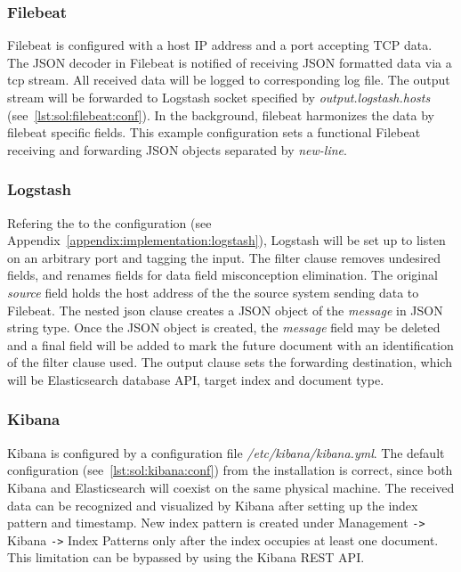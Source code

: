\documentclass[12pt,a4paper,twoside]{report}
\begin{document}
			\subsubsection*{Filebeat}
				Filebeat is configured with a host IP address and a port accepting TCP data. The JSON decoder in Filebeat is notified of receiving JSON formatted data via a tcp stream. All received data will be logged to corresponding log file. The output stream will be forwarded to Logstash socket specified by \emph{output.logstash.hosts} (see~\autoref{lst:sol:filebeat:conf}). In the background, filebeat harmonizes the data by filebeat specific fields. This example configuration sets a functional Filebeat receiving and forwarding JSON objects separated by \emph{new-line}.
				
			\subsubsection*{Logstash}
				Refering the to the configuration (see Appendix~\autoref{appendix:implementation:logstash}), Logstash will be set up to listen on an arbitrary port and tagging the input. The filter clause removes undesired fields, and renames fields for data field misconception elimination. The original \emph{source} field holds the host address of the the source system sending data to Filebeat. The nested json clause creates a JSON object of the \emph{message} in JSON string type. Once the JSON object is created, the \emph{message} field may be deleted and a final field will be added to mark the future document with an identification of the filter clause used. The output clause sets the forwarding destination, which will be Elasticsearch database API, target index and document type.
			\subsubsection*{Kibana}
				Kibana is configured by a configuration file \emph{/etc/kibana/kibana.yml}. The default configuration (see~\autoref{lst:sol:kibana:conf}) from the installation is correct, since both Kibana and Elasticsearch will coexist on the same physical machine. The received data can be recognized and visualized by Kibana after setting up the index pattern and timestamp. New index pattern is created under Management \texttt{->} Kibana \texttt{->} Index Patterns only after the index occupies at least one document. This limitation can be bypassed by using the Kibana REST API.
				
\end{document}

